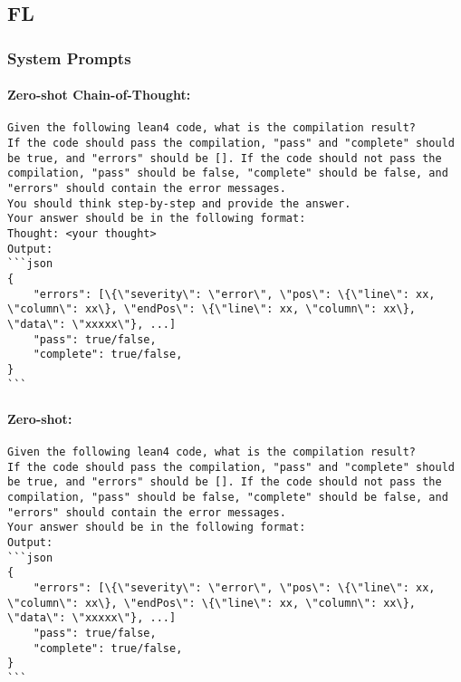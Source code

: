 \subsection{FL}

\subsubsection{System Prompts}


\paragraph{Zero-shot Chain-of-Thought:}

\begin{tcolorbox}[left=0mm,right=0mm,top=0mm,bottom=0mm,boxsep=1mm,arc=0mm,boxrule=0pt, frame empty, breakable]
    \small
    \begin{lstlisting}
Given the following lean4 code, what is the compilation result?
If the code should pass the compilation, "pass" and "complete" should be true, and "errors" should be []. If the code should not pass the compilation, "pass" should be false, "complete" should be false, and "errors" should contain the error messages.
You should think step-by-step and provide the answer.
Your answer should be in the following format:
Thought: <your thought>
Output:
```json
{
    "errors": [\{\"severity\": \"error\", \"pos\": \{\"line\": xx, \"column\": xx\}, \"endPos\": \{\"line\": xx, \"column\": xx\}, \"data\": \"xxxxx\"}, ...]
    "pass": true/false,
    "complete": true/false,
}
```
\end{lstlisting}
\end{tcolorbox}




\paragraph{Zero-shot:}

\begin{tcolorbox}[left=0mm,right=0mm,top=0mm,bottom=0mm,boxsep=1mm,arc=0mm,boxrule=0pt, frame empty, breakable]
    \small
    \begin{lstlisting}
Given the following lean4 code, what is the compilation result?
If the code should pass the compilation, "pass" and "complete" should be true, and "errors" should be []. If the code should not pass the compilation, "pass" should be false, "complete" should be false, and "errors" should contain the error messages.
Your answer should be in the following format:
Output:
```json
{
    "errors": [\{\"severity\": \"error\", \"pos\": \{\"line\": xx, \"column\": xx\}, \"endPos\": \{\"line\": xx, \"column\": xx\}, \"data\": \"xxxxx\"}, ...]
    "pass": true/false,
    "complete": true/false,
}
```
\end{lstlisting}
\end{tcolorbox}




